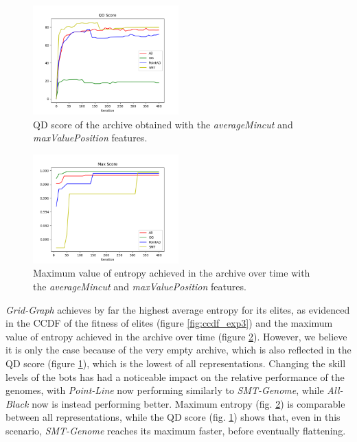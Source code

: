 \begin{figure}[H]
    \centering
    \includegraphics[width=0.5\textwidth]{images/Exp3/qd_score.png}
    \caption{QD score of the archive obtained with the \textit{averageMincut} and \textit{maxValuePosition} features.}
    \label{fig:qd_score_exp3}
\end{figure}

\begin{figure}[H]
    \centering
    \includegraphics[width=0.5\textwidth]{images/Exp3/max_score.png}
    \caption{Maximum value of entropy achieved in the archive over time with the \textit{averageMincut} and \textit{maxValuePosition} features.}
    \label{fig:max_score_exp3}
\end{figure}

\textit{Grid-Graph} achieves by far the highest average entropy for its elites, as evidenced in the CCDF of the fitness of elites (figure \ref{fig:ccdf_exp3}) and the maximum value of entropy achieved in the archive over time (figure \ref{fig:max_score_exp3}). However, we believe it is only the case because of the very empty archive, which is also reflected in the QD score (figure \ref{fig:qd_score_exp3}), which is the lowest of all representations. Changing the skill levels of the bots has had a noticeable impact on the relative performance of the genomes, with \textit{Point-Line} now performing similarly to \textit{SMT-Genome}, while \textit{All-Black} now is instead performing better. Maximum entropy (fig. \ref{fig:max_score_exp3}) is comparable between all representations, while the QD score (fig. \ref{fig:qd_score_exp3}) shows that, even in this scenario, \textit{SMT-Genome} reaches its maximum faster, before eventually flattening.

